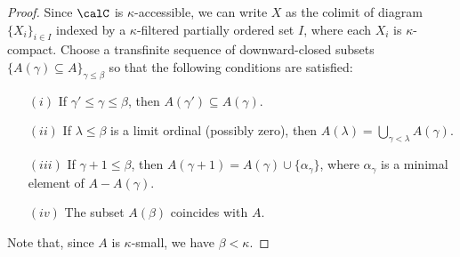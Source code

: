 \begin{proof}
Since $\calC$ is $\kappa$-accessible, we can write $X$ as the colimit of 
diagram $\{ X_{i} \}_{i \in I}$ indexed by a $\kappa$-filtered partially ordered set $I$, where each $X_{i}$ is $\kappa$-compact. 
Choose a transfinite sequence of downward-closed subsets $\{ A(\gamma) \subseteq A \}_{\gamma \leq \beta}$ so that the following conditions are satisfied:
\begin{itemize}
\item[$(i)$] If $\gamma' \leq \gamma \leq \beta$, then $A(\gamma') \subseteq A(\gamma)$.
\item[$(ii)$] If $\lambda \leq \beta$ is a limit ordinal (possibly zero), then
$A(\lambda) = \bigcup_{ \gamma < \lambda} A(\gamma)$.
\item[$(iii)$] If $\gamma + 1 \leq \beta$, then $A(\gamma+1) = A(\gamma) \cup \{ \alpha_{\gamma} \}$, where $\alpha_{\gamma}$ is a minimal element of $A - A(\gamma)$.
\item[$(iv)$] The subset $A(\beta)$ coincides with $A$.
\end{itemize}
Note that, since $A$ is $\kappa$-small, we have $\beta < \kappa$.


\end{proof}
